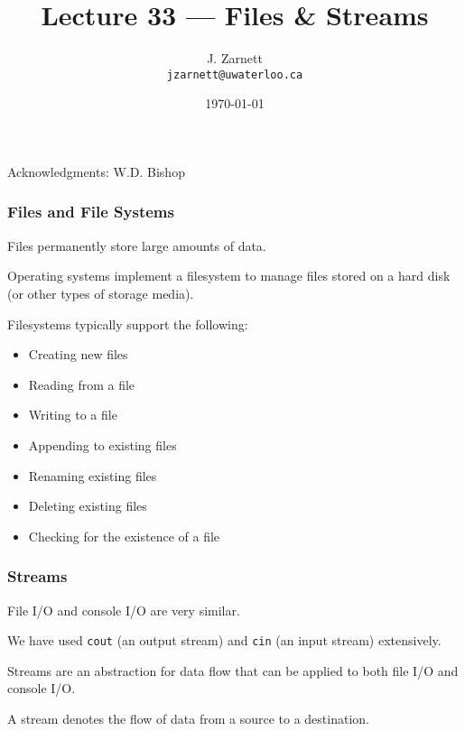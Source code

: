 

\title{Lecture 33 --- Files \& Streams }

\author{J. Zarnett\\
\texttt{jzarnett@uwaterloo.ca}}
\date{\today}



\begin{frame}
  \titlepage
  
  \begin{center}
  \small{Acknowledgments: W.D. Bishop}
  \end{center}
\end{frame}

\begin{frame}
\frametitle{Files and File Systems}

Files permanently store large amounts of data.

Operating systems implement a filesystem to manage files stored on a hard disk (or other types of storage media).

Filesystems typically support the following:
\begin{itemize}
\item Creating new files
\item Reading from a file
\item Writing to a file
\item Appending to existing files
\item Renaming existing files
\item Deleting existing files
\item Checking for the existence of a file
\end{itemize}

\end{frame}

\begin{frame}
\frametitle{Streams}

File I/O and console I/O are very similar.

We have used \texttt{cout} (an output stream) and \texttt{cin} (an input stream) extensively.

\alert{Stream}s are an abstraction for data flow that can be applied to both file I/O and console I/O.

A stream denotes the flow of data from a source to a destination.



\end{frame}


